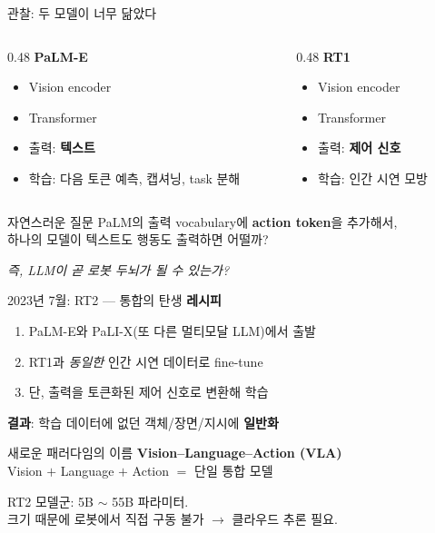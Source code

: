 \documentclass[aspectratio=169,10pt]{beamer}
\begin{document}
\begin{frame}{관찰: 두 모델이 너무 닮았다}
\begin{columns}[T]
\begin{column}{0.48\textwidth}
\textbf{PaLM-E}
\begin{itemize}
  \item Vision encoder
  \item Transformer
  \item 출력: \textbf{텍스트}
  \item 학습: 다음 토큰 예측, 캡셔닝, task 분해
\end{itemize}
\end{column}
\begin{column}{0.48\textwidth}
\textbf{RT1}
\begin{itemize}
  \item Vision encoder
  \item Transformer
  \item 출력: \textbf{제어 신호}
  \item 학습: 인간 시연 모방
\end{itemize}
\end{column}
\end{columns}

\vspace{1em}
\begin{block}{자연스러운 질문}
PaLM의 출력 vocabulary에 \textbf{action token}을 추가해서, \\
하나의 모델이 텍스트도 행동도 출력하면 어떨까?
\end{block}

\vspace{0.6em}
\centering\textit{즉, LLM이 곧 로봇 두뇌가 될 수 있는가?}
\end{frame}

\begin{frame}{2023년 7월: RT2 --- 통합의 탄생}
\textbf{레시피}
\begin{enumerate}
  \item PaLM-E와 PaLI-X(또 다른 멀티모달 LLM)에서 출발
  \item RT1과 \emph{동일한} 인간 시연 데이터로 fine-tune
  \item 단, 출력을 \alert{토큰화된 제어 신호}로 변환해 학습
\end{enumerate}

\vspace{0.6em}
\textbf{결과}: 학습 데이터에 없던 객체/장면/지시에 \textbf{일반화}

\vspace{0.6em}
\begin{block}{새로운 패러다임의 이름}
\centering
\Large\textbf{Vision--Language--Action (VLA)}\\
\normalsize Vision $+$ Language $+$ Action $=$ 단일 통합 모델
\end{block}

\vspace{0.5em}
\footnotesize
RT2 모델군: 5B $\sim$ 55B 파라미터. \\
크기 때문에 로봇에서 직접 구동 불가 $\to$ 클라우드 추론 필요.
\end{frame}
\end{document}
